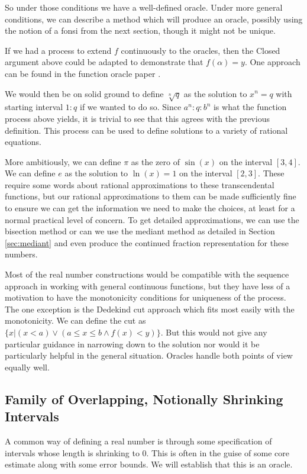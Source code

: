 \documentclass[12pt]{article}
\begin{document}
So under those conditions we have a well-defined oracle. Under more general conditions, we can describe a method which will produce an oracle, possibly using the notion of a fonsi from the next section, though it might not be unique.  

If we had a process to extend $f$ continuously to the oracles, then the Closed argument above could be adapted to demonstrate that $f(\alpha)=y$. One approach can be found in the function oracle  paper \cite{taylor23funora}.

We would then be on solid ground to define $\sqrt[n]{q}$ as the solution to $x^n = q$ with starting interval $1:q$ if we wanted to do so. Since $a^n : q: b^n$ is what the function process above yields, it is trivial to see that this agrees with the previous definition. This process can be used to define solutions to a variety of rational equations. 

More ambitiously, we can define $\pi$ as the zero of $\sin(x)$ on the interval $[3,4]$. We can define $e$ as the solution to  $\ln(x)=1$ on the interval $[2,3]$. These require some words about rational approximations to these transcendental functions, but our rational approximations to them can be made sufficiently fine to ensure we can get the information we need to make the choices, at least for a normal practical level of concern.  To get detailed approximations, we can use the bisection method or can we use the mediant method as detailed in Section \ref{sec:mediant} and even produce the continued fraction representation for these numbers.
 
Most of the real number constructions would be compatible with the sequence approach in working with general continuous functions, but they have less of a motivation to have the monotonicity conditions for uniqueness of the process. The one exception is the Dedekind cut approach which fits most easily with the monotonicity. We can define the cut as $\{x| (x<a) \vee (a \leq x \leq b \wedge f(x) < y) \}$. But this would not give any particular guidance in narrowing down to the solution nor would it be particularly helpful in the general situation. Oracles handle both points of view equally well. 

\subsection{Family of Overlapping, Notionally Shrinking Intervals} \label{sec:ni}

A common way of defining a real number is through some specification of intervals whose length is shrinking to 0. This is often in the guise of some core estimate along with some error bounds. We will establish that this is an oracle. 
\end{document}
